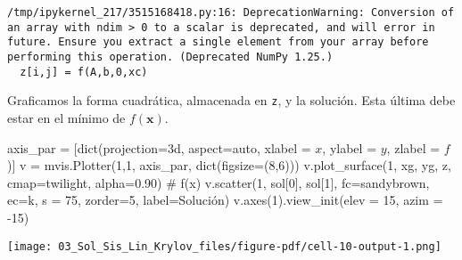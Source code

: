 \documentclass[
  letterpaper,
  DIV=11,
  numbers=noendperiod]{scrreprt}
\newenvironment{Shaded}{\begin{snugshade}}{\end{snugshade}}
\newcommand{\BuiltInTok}[1]{\textcolor[rgb]{0.00,0.23,0.31}{#1}}
\newcommand{\CommentTok}[1]{\textcolor[rgb]{0.37,0.37,0.37}{#1}}
\newcommand{\DecValTok}[1]{\textcolor[rgb]{0.68,0.00,0.00}{#1}}
\newcommand{\FloatTok}[1]{\textcolor[rgb]{0.68,0.00,0.00}{#1}}
\newcommand{\NormalTok}[1]{\textcolor[rgb]{0.00,0.23,0.31}{#1}}
\newcommand{\OperatorTok}[1]{\textcolor[rgb]{0.37,0.37,0.37}{#1}}
\newcommand{\StringTok}[1]{\textcolor[rgb]{0.13,0.47,0.30}{#1}}
\begin{document}
\begin{verbatim}
/tmp/ipykernel_217/3515168418.py:16: DeprecationWarning: Conversion of an array with ndim > 0 to a scalar is deprecated, and will error in future. Ensure you extract a single element from your array before performing this operation. (Deprecated NumPy 1.25.)
  z[i,j] = f(A,b,0,xc)
\end{verbatim}

Graficamos la forma cuadrática, almacenada en \texttt{z}, y la solución.
Esta última debe estar en el mínimo de \(f(\mathbf{x})\).

\begin{Shaded}
\begin{Highlighting}[]
\NormalTok{axis\_par }\OperatorTok{=}\NormalTok{ [}\BuiltInTok{dict}\NormalTok{(projection}\OperatorTok{=}\StringTok{\textquotesingle{}3d\textquotesingle{}}\NormalTok{, aspect}\OperatorTok{=}\StringTok{\textquotesingle{}auto\textquotesingle{}}\NormalTok{, xlabel }\OperatorTok{=} \StringTok{\textquotesingle{}$x$\textquotesingle{}}\NormalTok{, ylabel }\OperatorTok{=} \StringTok{\textquotesingle{}$y$\textquotesingle{}}\NormalTok{, zlabel }\OperatorTok{=} \StringTok{\textquotesingle{}$f$\textquotesingle{}}\NormalTok{)]}
\NormalTok{v }\OperatorTok{=}\NormalTok{ mvis.Plotter(}\DecValTok{1}\NormalTok{,}\DecValTok{1}\NormalTok{, axis\_par, }\BuiltInTok{dict}\NormalTok{(figsize}\OperatorTok{=}\NormalTok{(}\DecValTok{8}\NormalTok{,}\DecValTok{6}\NormalTok{)))}
\NormalTok{v.plot\_surface(}\DecValTok{1}\NormalTok{, xg, yg, z, cmap}\OperatorTok{=}\StringTok{\textquotesingle{}twilight\textquotesingle{}}\NormalTok{, alpha}\OperatorTok{=}\FloatTok{0.90}\NormalTok{) }\CommentTok{\# f(x)}
\NormalTok{v.scatter(}\DecValTok{1}\NormalTok{, sol[}\DecValTok{0}\NormalTok{], sol[}\DecValTok{1}\NormalTok{], fc}\OperatorTok{=}\StringTok{\textquotesingle{}sandybrown\textquotesingle{}}\NormalTok{, ec}\OperatorTok{=}\StringTok{\textquotesingle{}k\textquotesingle{}}\NormalTok{, s }\OperatorTok{=} \DecValTok{75}\NormalTok{, zorder}\OperatorTok{=}\DecValTok{5}\NormalTok{, label}\OperatorTok{=}\StringTok{\textquotesingle{}Solución\textquotesingle{}}\NormalTok{)}
\NormalTok{v.axes(}\DecValTok{1}\NormalTok{).view\_init(elev }\OperatorTok{=} \DecValTok{15}\NormalTok{, azim }\OperatorTok{=} \OperatorTok{{-}}\DecValTok{15}\NormalTok{)}
\end{Highlighting}
\end{Shaded}

\texttt{[image: 03\_Sol\_Sis\_Lin\_Krylov\_files/figure-pdf/cell-10-output-1.png]}
\end{document}
